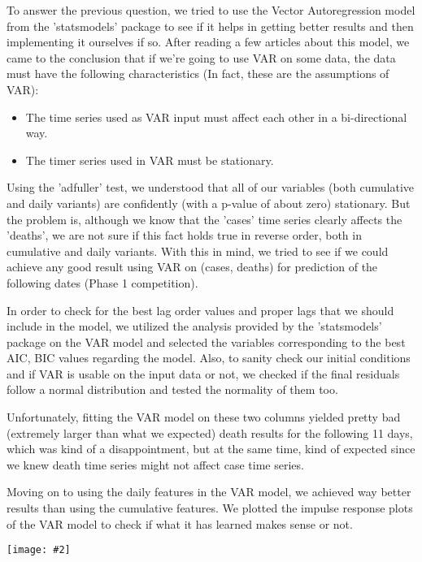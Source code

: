 \documentclass{article}
\newcommand{\centerfig}[2]{\begin{center}\texttt{[image: \#2]}\end{center}}
\begin{document}
To answer the previous question, we tried to use the Vector Autoregression model from the 'statsmodels' package to see if it helps in getting better results and then implementing it ourselves if so. After reading a few articles about this model, we came to the conclusion that if we’re going to use VAR on some data, the data must have the following characteristics (In fact, these are the assumptions of VAR):

\begin{itemize}
\item The time series used as VAR input must affect each other in a bi-directional way.

\item The timer series used in VAR must be stationary. 
\end{itemize}

Using the 'adfuller' test, we understood that all of our variables (both cumulative and daily variants) are confidently (with a p-value of about zero) stationary. But the problem is, although we know that the 'cases' time series clearly affects the 'deaths', we are not sure if this fact holds true in reverse order, both in cumulative and daily variants. With this in mind, we tried to see if we could achieve any good result using VAR on (cases, deaths) for prediction of the following dates (Phase 1 competition). 

In order to check for the best lag order values and proper lags that we should include in the model, we utilized the analysis provided by the 'statsmodels' package on the VAR model and selected the variables corresponding to the best AIC, BIC values regarding the model. Also, to sanity check our initial conditions and if VAR is usable on the input data or not, we checked if the final residuals follow a normal distribution and tested the normality of them too.

Unfortunately, fitting the VAR model on these two columns yielded pretty bad (extremely larger than what we expected) death results for the following 11 days, which was kind of a disappointment, but at the same time, kind of expected since we knew death time series might not affect case time series. 

Moving on to using the daily features in the VAR model, we achieved way better results than using the cumulative features. We plotted the impulse response plots of the VAR model to check if what it has learned makes sense or not.

\centerfig{.6}{./Images/9}
\end{document}
